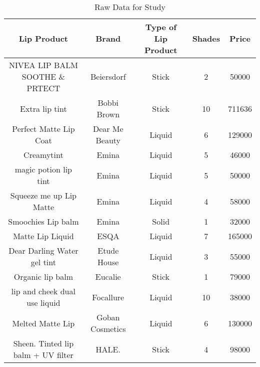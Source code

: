 \begin{table}[htbp]
    \centering
    \caption{Raw Data for Study}
    \label{tab:Table_Raw}
    \begin{tabular}{ccccc}        \hline
        \textbf{Lip Product}                    & \textbf{Brand}    & \textbf{Type of Lip Product} & \textbf{Shades} & \textbf{Price} \\ \hline
        NIVEA LIP BALM SOOTHE \& PRTECT         & Beiersdorf        & Stick                        & 2               & 50000          \\
        Extra lip tint                          & Bobbi Brown       & Stick                        & 10              & 711636         \\
        Perfect Matte Lip Coat                  & Dear Me Beauty    & Liquid                       & 6               & 129000         \\
        Creamytint                              & Emina             & Liquid                       & 5               & 46000          \\
        magic potion lip tint                   & Emina             & Liquid                       & 5               & 50000          \\
        Squeeze me up Lip Matte                 & Emina             & Liquid                       & 4               & 58000          \\
        Smoochies Lip balm                      & Emina             & Solid                        & 1               & 32000          \\
        Matte Lip Liquid                        & ESQA              & Liquid                       & 7               & 165000         \\
        Dear Darling Water gel tint             & Etude House       & Liquid                       & 3               & 55000          \\
        Organic lip balm                        & Eucalie           & Stick                        & 1               & 79000          \\
        lip and cheek dual use liquid           & Focallure         & Liquid                       & 10              & 38000          \\
        Melted Matte Lip                        & Goban Cosmetics   & Liquid                       & 6               & 130000         \\
        Sheen. Tinted lip balm + UV filter      & HALE.             & Stick                        & 4               & 98000          \\

\end{tabular}
\end{table}
